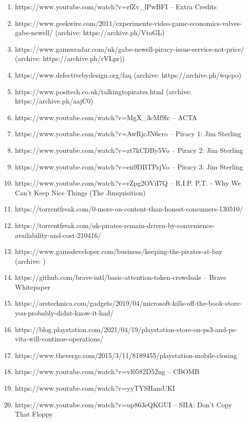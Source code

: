 \documentclass{article}
\begin{document}
{{{\begin{enumerate}
    \item https://www.youtube.com/watch?v=rfZv\_lPwBFI -- Extra Credits
    \item https://www.geekwire.com/2011/experiments-video-game-economics-valves-gabe-newell/ (archive: https://archive.ph/VtoGL)
    \item https://www.gamesradar.com/uk/gabe-newell-piracy-issue-service-not-price/ (archive: https://archive.ph/rVLpr))
    \item https://www.defectivebydesign.org/faq (archive: https://archive.ph/wqcpo)
    \item https://www.positech.co.uk/talkingtopirates.html (archive: https://archive.ph/aajC0)
    \item https://www.youtube.com/watch?v=MgX\_3cMf9lc -- ACTA
    \item https://www.youtube.com/watch?v=AwRjcJN6cro -- Piracy 1: Jim Sterling
    \item https://www.youtube.com/watch?v=zt7kCDBy5Vo -- Piracy 2: Jim Sterling
    \item https://www.youtube.com/watch?v=en9DBTPsjVo -- Piracy 3: Jim Sterling
    \item https://www.youtube.com/watch?v=rZpg2OViI7Q -- R.I.P. P.T. - Why We Can't Keep Nice Things (The Jimquisition)
    \item https://torrentfreak.com/0-more-on-content-than-honest-consumers-130510/
    \item https://torrentfreak.com/uk-pirates-remain-driven-by-convenience-availability-and-cost-210416/
    \item https://www.gamedeveloper.com/business/keeping-the-pirates-at-bay (archive: )
    \item https://github.com/brave-intl/basic-attention-token-crowdsale  -- Brave Whitepaper
    \item https://arstechnica.com/gadgets/2019/04/microsoft-kills-off-the-book-store-you-probably-didnt-know-it-had/
    \item https://blog.playstation.com/2021/04/19/playstation-store-on-ps3-and-ps-vita-will-continue-operations/
    \item https://www.theverge.com/2015/3/11/8189455/playstation-mobile-closing
    \item https://www.youtube.com/watch?v=vl0582D52ng -- CBOMB
    \item https://www.youtube.com/watch?v=yyTYSHamUKI
    \item https://www.youtube.com/watch?v=up863eQKGUI -- SIIA: Don't Copy That Floppy

\end{enumerate}}}}
\end{document}
